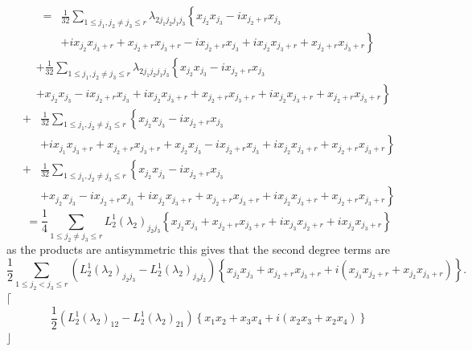 \documentclass[aps, preprint]{revtex4}
\begin{document}
\begin{align*} = & \frac{1}{32} \sum _{1 \leq j_{1} ,j_{2} \neq j_{3} \leq r}\lambda _{2 j_{1} j_{2} j_{1} j_{3}}\left \{x_{j_{2}} x_{j_{3}} -i x_{j_{2} +r} x_{j_{3}}\right . \\
 &  +i x_{j_{2}} x_{j_{3} +r} +x_{j_{2} +r} x_{j_{3} +r} -i x_{j_{2} +r} x_{j_{3}} +\left .i x_{j_{2}} x_{j_{3} +r} +x_{j_{2} +r} x_{j_{3} +r}\right \}\end{align*}
\begin{align*} &  +\frac{1}{32} \sum _{1 \leq j_{1} ,j_{2} \neq j_{3} \leq r}\lambda _{2 j_{1} j_{2} j_{1} j_{3}}\left \{x_{j_{2}} x_{j_{3}} -i x_{j_{2} +r} x_{j_{3}}\right . \\
 &  +x_{j_{2}} x_{j_{3}} -i x_{j_{2} +r} x_{j_{3}} +i x_{j_{2}} x_{j_{3} +r} +x_{j_{2} +r} x_{j_{3} +r} +\left .i x_{j_{2}} x_{j_{3} +r} +x_{j_{2} +r} x_{j_{3} +r}\right \}\end{align*}
\begin{align*} + & \frac{1}{32} \sum _{1 \leq j_{1} ,j_{2} \neq j_{3} \leq r}\left \{x_{j_{2}} x_{j_{3}} -i x_{j_{2} +r} x_{j_{3}}\right . \\
 &  +i x_{j_{1}} x_{j_{3} +r} +x_{j_{2} +r} x_{j_{3} +r} +x_{j_{2}} x_{j_{3}} -i x_{j_{2} +r} x_{j_{3}} +\left .i x_{j_{2}} x_{j_{3} +r} +x_{j_{2} +r} x_{j_{3} +r}\right \}\end{align*}
\begin{align*} + & \frac{1}{32} \sum _{1 \leq j_{1} ,j_{2} \neq j_{3} \leq r}\left \{x_{j_{2}} x_{j_{3}} -i x_{j_{2} +r} x_{j_{3}}\right . \\
 &  +x_{j_{2}} x_{j_{3}} -i x_{j_{2} +r} x_{j_{3}} +i x_{j_{2}} x_{j_{3} +r} +x_{j_{2} +r} x_{j_{3} +r} +\left .i x_{j_{2}} x_{j_{3} +r} +x_{j_{2} +r} x_{j_{3} +r}\right \}\end{align*}
\begin{equation*} =\frac{1}{4} \sum _{1 \leq j_{2} \neq j_{3} \leq r}L_{2}^{1} \left (\lambda _{2}\right )_{j_{2} j_{3}} \left \{x_{j_{2}} x_{j_{3}} +x_{j_{2} +r} x_{j_{3} +r} +i x_{j_{3}} x_{j_{2} +r} +i x_{j_{2}} x_{j_{3} +r}\right \}
\end{equation*}as the products are antisymmetric this gives that the second degree terms are
\begin{equation}\frac{1}{2} \sum _{1 \leq j_{2} <j_{3} \leq r}\left (L_{2}^{1} \left (\lambda _{2}\right )_{j_{2} j_{3}} -L_{2}^{1} \left (\lambda _{2}\right )_{j_{3} j_{2}}\right ) \left \{x_{j_{2}} x_{j_{3}} +x_{j_{2} +r} x_{j_{3} +r} +i \left (x_{j_{3}} x_{j_{2} +r} +x_{j_{2}} x_{j_{3} +r}\right )\right \}\text{.}
\end{equation}$\lceil $
\begin{equation}\frac{1}{2} \left (L_{2}^{1} \left (\lambda _{2}\right )_{1 2} -L_{2}^{1} \left (\lambda _{2}\right )_{2 1}\right ) \left \{x_{1} x_{2} +x_{3} x_{4} +i \left (x_{2} x_{3} +x_{2} x_{4}\right )\right \}
\end{equation}$\rfloor $ 
\end{document}
